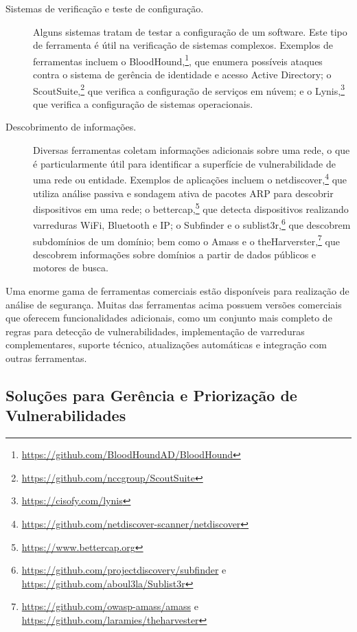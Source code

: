 \begin{description}
    \item[Sistemas de verificação e teste de configuração.] Alguns sistemas tratam de testar a configuração de um software. Este tipo de ferramenta é útil na verificação de sistemas complexos. Exemplos de ferramentas incluem o
    BloodHound,\footnote{\url{https://github.com/BloodHoundAD/BloodHound}}, que enumera possíveis ataques contra o sistema de gerência de identidade e acesso Active Directory; o ScoutSuite,\footnote{\url{https://github.com/nccgroup/ScoutSuite}} que verifica a configuração de serviços em núvem; e o Lynis,\footnote{\url{https://cisofy.com/lynis}} que verifica a configuração de sistemas operacionais.

    \item[Descobrimento de informações.] Diversas ferramentas coletam informações adicionais sobre uma rede, o que é particularmente útil para identificar a superfície de vulnerabilidade de uma rede ou entidade. Exemplos de aplicações incluem o \textsf{netdiscover},\footnote{\url{https://github.com/netdiscover-scanner/netdiscover}} que utiliza análise passiva e sondagem ativa de pacotes ARP para descobrir dispositivos em uma rede; o \textsf{bettercap},\footnote{\url{https://www.bettercap.org}} que detecta dispositivos realizando varreduras WiFi, Bluetooth e IP; o Subfinder e o \textsf{sublist3r},\footnote{\url{https://github.com/projectdiscovery/subfinder} e \url{https://github.com/aboul3la/Sublist3r}} que descobrem subdomínios de um domínio; bem como o Amass e o \textsf{theHarverster},\footnote{\url{https://github.com/owasp-amass/amass} e \url{https://github.com/laramies/theharvester}} que descobrem informações sobre domínios a partir de dados públicos e motores de busca.

\end{description}

Uma enorme gama de ferramentas comerciais estão disponíveis para realização de análise de segurança. Muitas das ferramentas acima possuem versões comerciais que oferecem funcionalidades adicionais, como um conjunto mais completo de regras para detecção de vulnerabilidades, implementação de varreduras complementares, suporte técnico, atualizações automáticas e integração com outras ferramentas.

\subsection{Soluções para Gerência e Priorização de Vulnerabilidades}\label{sec:alt.prio}

